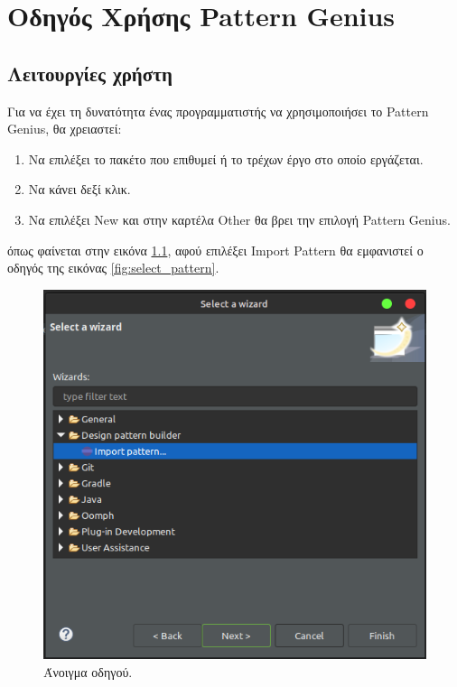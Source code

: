 \chapter{Οδηγός Χρήσης Pattern Genius}
\label{ch:manual}


\section{Λειτουργίες χρήστη}
\label{sec:manual}
Για να έχει τη δυνατότητα ένας προγραμματιστής να χρησιμοποιήσει το Pattern Genius, θα χρειαστεί:
\begin{enumerate}
    \item Να επιλέξει το πακέτο που επιθυμεί 
        ή το τρέχων έργο στο οποίο εργάζεται. 
    \item Να κάνει δεξί κλικ.
    \item Να επιλέξει New και στην καρτέλα 
        Other θα βρει την επιλογή Pattern Genius.
\end{enumerate} 
όπως φαίνεται στην εικόνα \ref{fig:open_wizard}, 
αφού επιλέξει Import Pattern θα εμφανιστεί ο οδηγός της εικόνας \ref{fig:select_pattern}.
\begin{figure}[H]
    \centering
    \includegraphics[width=1.0\textwidth]{Figures/open_wizard.png}
    \caption{Άνοιγμα οδηγού.}
    \label{fig:open_wizard}
\end{figure}
